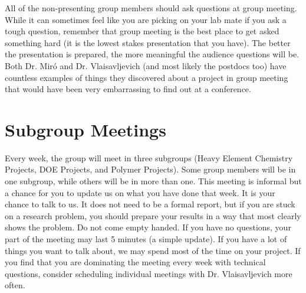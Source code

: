 \documentclass[letterpaper]{article}
\begin{document}
All of the non-presenting group members should ask questions at group meeting. While it can sometimes feel like you are picking on your lab mate if you ask a tough question, remember that group meeting is the best place to get asked something hard (it is the lowest stakes presentation that you have). The better the presentation is prepared, the more meaningful the audience questions will be. Both Dr. Mir\'o and Dr. Vlaisavljevich (and most likely the postdocs too) have countless examples of things they discovered about a project in group meeting that would have been very embarrassing to find out at a conference.  

\section*{Subgroup Meetings}
Every week, the group will meet in three subgroups (Heavy Element Chemistry Projects, DOE Projects, and Polymer Projects). Some group members will be in one subgroup, while others will be in more than one. This meeting is informal but a chance for you to update us on what you have done that week. It is your chance to talk to us. It does not need to be a formal report, but if you are stuck on a research problem, you should prepare your results in a way that most clearly shows the problem. Do not come empty handed. If you have no questions, your part of the meeting may last 5 minutes (a simple update). If you have a lot of things you want to talk about, we may spend most of the time on your project. If you find that you are dominating the meeting every week with technical questions, consider scheduling individual meetings with Dr. Vlaisavljevich more often.
\end{document}
